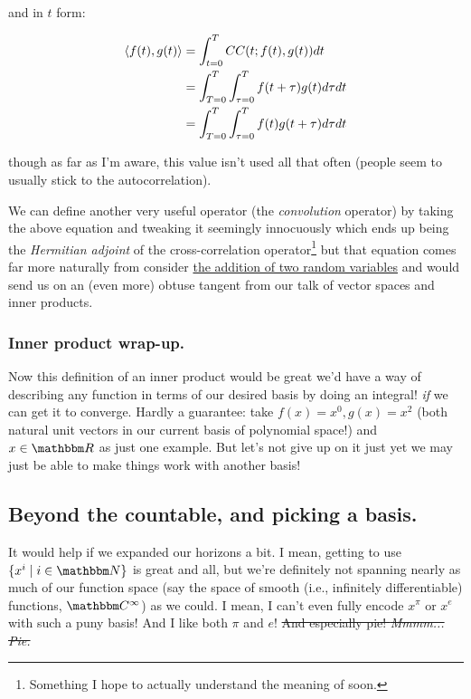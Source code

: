 \documentclass[letterpaper,12pt]{report}
\begin{document}
and in \(t\) form:

\[ \begin{split}
  \left<f(t),g(t)\right> &= \int_{t=0}^{T} CC(t; f(t), g(t)) dt \\
  &= \int_{T = 0}^{T} \int_{\tau = 0}^{T} f(t + \tau) g(t) d\tau dt \\
  &= \int_{T = 0}^{T} \int_{\tau = 0}^{T} f(t) g(t + \tau) d\tau dt
\end{split}
\]

though as far as I'm aware, this value isn't used all that
often (people seem to usually stick to the autocorrelation). \par

We can define another very useful operator
(the \emph{convolution} operator)
by taking the above equation and tweaking it seemingly innocuously
\textemdash{} which ends up being the \emph{Hermitian adjoint}
of the cross-correlation operator\footnote{
  Something I hope to actually understand the meaning of soon.
} \textemdash{}
but that equation comes far more naturally from consider
\href{https://stats.stackexchange.com/a/332127}{the addition of two random variables}
and would send us on an (even more) obtuse tangent from our talk of
vector spaces and inner products. 

\subsubsection*{Inner product wrap-up.}

Now this definition of an inner product would be great 
\textemdash{}
we'd have a way of describing any function in terms of 
our desired basis by doing an integral!
\textemdash{}
\emph{if}
we can get it to converge.
Hardly a guarantee: take \(f(x) = x^0, g(x) = x^2\)
(both natural unit vectors in 
our current basis of polynomial space!)
and \(x \in \domain{R}\) as just one example.
But let's not give up on it just yet \textemdash{}
we may just be able to make things work with another basis!

\subsection{Beyond the countable, and picking a basis.}

It would help if
we expanded our horizons a bit.
I mean, getting to use \(\{x^i \mid i \in \domain{N}\}\)
is great and all, but we're definitely not spanning nearly
as much of our function space (say the space of smooth
(i.e., infinitely differentiable) functions, 
\(\domain{C}^\infty\)) as we could.
I mean, I can't even fully encode \(x^\pi\) or \(x^e\) 
with such a puny basis! And I like both \(\pi\) and \(e\)!
\sout{And especially pie! \textit{Mmmm... Pie.}}\par
\end{document}
